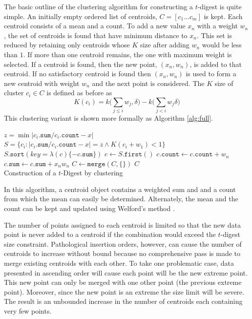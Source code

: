 \documentclass[11pt]{amsart}
\begin{document}
The basic outline of the clustering algorithm for constructing a $t$-digest is quite simple.  An initially empty ordered list of centroids, $C = [ c_1 \ldots c_m ]$ is kept.  Each centroid consists of a mean and a count.  To add a new value $x_n$ with a weight $w_n$, the set of centroids is found that have minimum distance to $x_n$.  This set is reduced by retaining only centroids whose $K$ size after adding $w_n$ would be less than $1$.  If more than one centroid remains, the one with maximum weight is selected.  If a centroid is found, then the new point, $(x_n,w_n)$, is added to that centroid. If no satisfactory centroid is found then $(x_n,w_n)$ is used to form a new centroid with weight $w_n$ and the next point is considered. The $K$ size of cluster $c_i \in C$ is defined as before as
\[
K(c_i) = k \big( \sum_{j \le i} w_j , \delta \big) - k \big(\sum_{j < i} w_j \delta\big)
\]
This clustering variant is shown more formally as Algorithm \ref{alg:full}.
 \begin{algorithm}[htb]
 \label{alg:full}
\SetNoFillComment
{}
 {
  $z = \min | c_i.\mathtt{sum}/c_i.\mathtt{count} - x |$\;
  $S = \lbrace c_i  :  |c_i.\mathtt{sum}/c_i.\mathtt{count} - x| = z \wedge K(c_i+w_1) < 1 \rbrace $\;
   {
       $S.\mathtt{sort}( key=\lambda (c) \lbrace -c.\mathtt{sum} \rbrace)$\;
       $c \gets S.\mathtt{first()}$ \;
       $c.\mathtt{count} \gets c.\mathtt{count} + w_n$\;
       $c.\mathtt{sum} \gets c.\mathtt{sum} + x_n w_n$\;
     } 
       {
         $C \gets \mathtt{merge}( C, \lbrace\rbrace ) $\;
       }
} 
\Return $ C $\\
\caption{Construction of a $t$-Digest by clustering}
\end{algorithm}

In this algorithm, a centroid object contains a weighted sum and and a count from which the mean can easily be determined.  Alternately, the mean and the count can be kept and updated using Welford's method \cite{wiki:welford, knuth2welford, welford62}.

The number of points assigned to each centroid is limited so that the new data point is never added to a centroid if the combination would exceed the $t$-digest size constraint. Pathological insertion orders, however, can cause the number of centroids to increase without bound because no comprehensive pass is made to merge existing centroids with each other. To take one problematic case, data presented in ascending order will cause each point will be the new extreme point. This new point can only be merged with one other point (the previous extreme point). Moreover, since the new point is an extreme the size limit will be severe. The result is an unbounded increase in the number of centroids each containing very few points.
\end{document}

